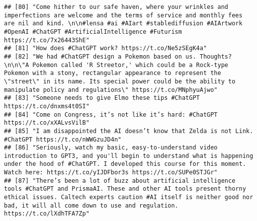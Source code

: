 \documentclass[
]{article}
\begin{document}
\begin{verbatim}
## [80] "Come hither to our safe haven, where your wrinkles and imperfections are welcome and the terms of service and monthly fees are nil and kind. \n\n#lensa #ai #AIart #stablediffusion #AIArtwork #OpenAI #ChatGPT #ArtificialIntelligence #Futurism https://t.co/7x26443ShE"                                                      
## [81] "How does #ChatGPT work? https://t.co/Ne5zSEgK4a"                                                                                                                                                                                                                                                                                
## [82] "We had #ChatGPT design a Pokemon based on us. Thoughts?\n\n\"A Pokemon called 'R Streetor,' which could be a Rock-type Pokemon with a stony, rectangular appearance to represent the \"street\" in its name. Its special power could be the ability to manipulate policy and regulations\" https://t.co/MNphyuAjwo"             
## [83] "Someone needs to give Elmo these tips #ChatGPT https://t.co/dnxms4t0SI"                                                                                                                                                                                                                                                         
## [84] "Come on Congress, it’s not like it’s hard: #ChatGPT https://t.co/xXALvsVilB"                                                                                                                                                                                                                                                    
## [85] "I am disappointed the AI doesn’t know that Zelda is not Link. #ChatGPT https://t.co/nWWGzuJD4n"                                                                                                                                                                                                                                 
## [86] "Seriously, watch my basic, easy-to-understand video introduction to GPT3, and you'll begin to understand what is happening under the hood of #ChatGPT. I developed this course for this moment. Watch here: https://t.co/yIJDFbor3s https://t.co/SUPe0STJGr"                                                                    
## [87] "There’s been a lot of buzz about artificial intelligence tools #ChatGPT and PrismaAI. These and other AI tools present thorny ethical issues. Caltech experts caution #AI itself is neither good nor bad, it will all come down to use and regulation. https://t.co/lXdhTFA7Zp"                                                 

\end{verbatim}
\end{document}
